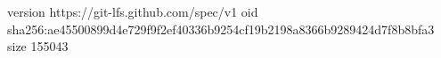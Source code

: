 version https://git-lfs.github.com/spec/v1
oid sha256:ae45500899d4e729f9f2ef40336b9254cf19b2198a8366b9289424d7f8b8bfa3
size 155043
